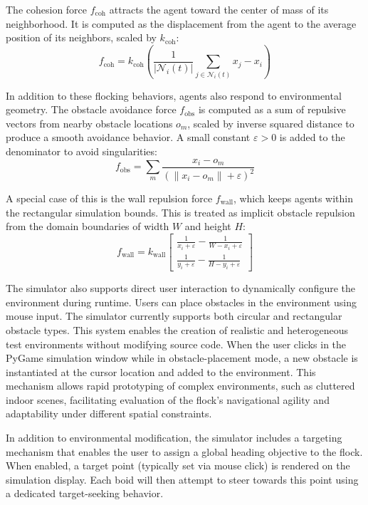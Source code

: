 \documentclass[12pt]{article}
\begin{document}
The cohesion force \(f_\text{coh}\) attracts the agent toward the center of mass of its neighborhood. It is computed as the displacement from the agent to the average position of its neighbors, scaled by \(k_\text{coh}\): 
\[ f_\text{coh} = k_\text{coh} \left( \frac{1}{|\mathcal{N}_i(t)|} \sum_{j \in \mathcal{N}_i(t)} x_j - x_i \right) \]

In addition to these flocking behaviors, agents also respond to environmental geometry. The obstacle avoidance force \(f_{\text{obs}}\) is computed as a sum of repulsive vectors from nearby obstacle locations \(o_m\), scaled by inverse squared distance to produce a smooth avoidance behavior. A small constant \(\varepsilon > 0\) is added to the denominator to avoid singularities:
\[ f_\text{obs} = \sum_m \frac{x_i - o_m}{\left( \|x_i - o_m\| + \varepsilon \right)^2} \]

A special case of this is the wall repulsion force \(f_\text{wall}\), which keeps agents within the rectangular simulation bounds. This is treated as implicit obstacle repulsion from the domain boundaries of width \(W\) and height \(H\): \[ f_\text{wall} = k_\text{wall} \begin{bmatrix}
\frac{1}{x_i + \varepsilon} - \frac{1}{W - x_i + \varepsilon} \\
\frac{1}{y_i + \varepsilon} - \frac{1}{H - y_i + \varepsilon}
\end{bmatrix} \]

The simulator also supports direct user interaction to dynamically configure the environment during runtime. Users can place obstacles in the environment using mouse input. The simulator currently supports both circular and rectangular obstacle types. This system enables the creation of realistic and heterogeneous test environments without modifying source code. When the user clicks in the PyGame simulation window while in obstacle-placement mode, a new obstacle is instantiated at the cursor location and added to the environment. This mechanism allows rapid prototyping of complex environments, such as cluttered indoor scenes, facilitating evaluation of the flock's navigational agility and adaptability under different spatial constraints.

In addition to environmental modification, the simulator includes a targeting mechanism that enables the user to assign a global heading objective to the flock. When enabled, a target point (typically set via mouse click) is rendered on the simulation display. Each boid will then attempt to steer towards this point using a dedicated target-seeking behavior.
\end{document}
